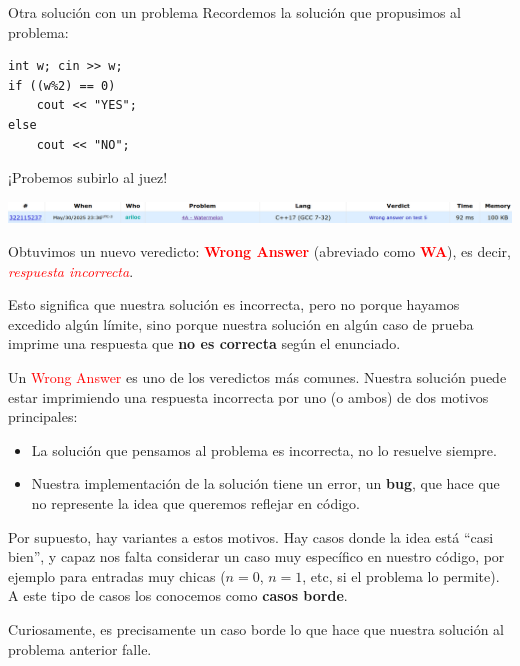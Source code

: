 \documentclass{beamer}
\begin{document}
    \begin{frame}[fragile]{Otra solución con un problema}
        Recordemos la solución que propusimos al problema: \pause

        \begin{verbatim}
int w; cin >> w;
if ((w%2) == 0)
    cout << "YES"; 
else
    cout << "NO"; 
        \end{verbatim}
        \pause

        \begin{center}
            \LARGE
            ¡Probemos subirlo al juez!
        \end{center} \pause

        \begin{center}
            \includegraphics[width=.95\linewidth]{./res/cf_wa.png}
        \end{center}\pause

        Obtuvimos un nuevo veredicto: \textbf{\textcolor{red}{Wrong Answer}} (abreviado como \textbf{\textcolor{red}{WA}}), es decir, \textit{\textcolor{red}{respuesta incorrecta}}. \pause

        Esto significa que nuestra solución es incorrecta, pero no porque hayamos excedido algún límite, sino porque nuestra solución en algún caso de prueba imprime una respuesta que \textbf{no es correcta} según el enunciado.
    \end{frame}

    \begin{frame}[noframenumbering]
        Un \textcolor{red}{Wrong Answer} es uno de los veredictos más comunes. Nuestra solución puede estar imprimiendo una respuesta incorrecta por uno (o ambos) de dos motivos principales: \pause

        \begin{itemize}
            \item La solución que pensamos al problema es incorrecta, no lo resuelve siempre. \pause

            \item Nuestra implementación de la solución tiene un error, un \textbf{bug}, que hace que no represente la idea que queremos reflejar en código. \pause
        \end{itemize}

        Por supuesto, hay variantes a estos motivos. Hay casos donde la idea está ``casi bien'', y capaz nos falta considerar un caso muy específico en nuestro código, por ejemplo para entradas muy chicas ($n=0$, $n=1$, etc, si el problema lo permite). A este tipo de casos los conocemos como \textbf{casos borde}. \pause

        Curiosamente, es precisamente un caso borde lo que hace que nuestra solución al problema anterior falle.
    \end{frame}
\end{document}
